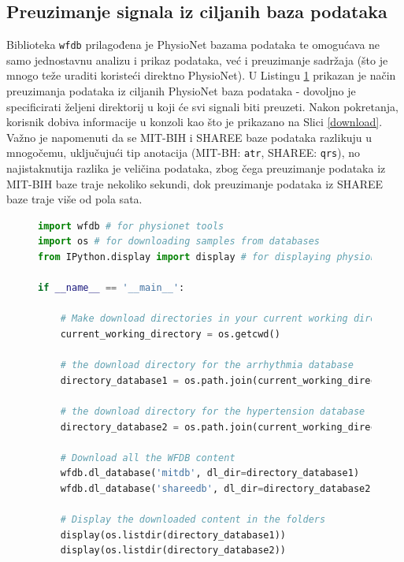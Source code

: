 \documentclass[12pt,a4paper]{article}
\begin{document}
\subsection{Preuzimanje signala iz ciljanih baza podataka}

\quad Biblioteka \texttt{wfdb} prilagođena je PhysioNet bazama podataka te omogućava ne samo jednostavnu analizu i prikaz podataka, već i preuzimanje sadržaja (što je mnogo teže uraditi koristeći direktno PhysioNet). U Listingu \ref{downloadlst} prikazan je način preuzimanja podataka iz ciljanih PhysioNet baza podataka - dovoljno je specificirati željeni direktorij u koji će svi signali biti preuzeti. Nakon pokretanja, korisnik dobiva informacije u konzoli kao što je prikazano na Slici \ref{download}. Važno je napomenuti da se MIT-BIH i SHAREE baze podataka razlikuju u mnogočemu, uključujući tip anotacija (MIT-BH: \texttt{atr}, SHAREE: \texttt{qrs}), no najistaknutija razlika je veličina podataka, zbog čega preuzimanje podataka iz MIT-BIH baze traje nekoliko sekundi, dok preuzimanje podataka iz SHAREE baze traje više od pola sata.

\begin{figure}
\label{downloadlst}
\begin{lstlisting}[language=python]
import wfdb # for physionet tools
import os # for downloading samples from databases
from IPython.display import display # for displaying physionet libraries

if __name__ == '__main__':

    # Make download directories in your current working directory
    current_working_directory = os.getcwd()

    # the download directory for the arrhythmia database
    directory_database1 = os.path.join(current_working_directory, 'mitdb')

    # the download directory for the hypertension database
    directory_database2 = os.path.join(current_working_directory, 'shareedb')

    # Download all the WFDB content
    wfdb.dl_database('mitdb', dl_dir=directory_database1)
    wfdb.dl_database('shareedb', dl_dir=directory_database2)

    # Display the downloaded content in the folders
    display(os.listdir(directory_database1))
    display(os.listdir(directory_database2))
\end{lstlisting}
\end{figure}
\end{document}
